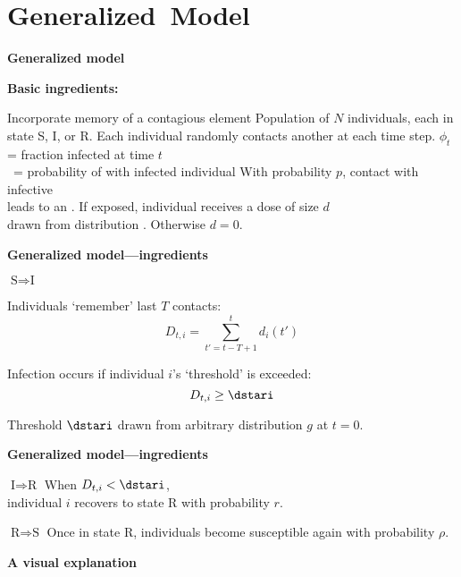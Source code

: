 \section{Generalized\ Model}


  \textbf{Generalized model}

  \textbf{Basic ingredients:}
    
     Incorporate memory of a contagious element\cite{dodds2004a,dodds2005a}
     Population of $N$ individuals, each in state S, I, or R.
     Each individual randomly contacts another at each time step.
     $\phi_t$ = fraction infected at time $t$ \\
      \quad \quad \ = probability of \underline{} with infected individual
     With probability $p$, contact with infective\\
      \quad leads to an \underline{}.
     If exposed, individual receives a dose of size $d$\\
      \quad  drawn from distribution .  Otherwise $d=0$.
    
  



  \textbf{Generalized model---ingredients}

  \textbf{$\boxed{\mbox{S} \Rightarrow \mbox{I}}$}
    
    
      Individuals `remember' last $T$ contacts:
      $$ D_{t,i} = \sum_{t'=t-T+1}^{t} d_i(t') $$
     
      Infection occurs if individual $i$'s `threshold' is exceeded:
      $$ D_{t,i} \ge \dstari $$
    
      Threshold $\dstari$ drawn from arbitrary distribution \alert{$g$} at $t=0$.
    
  


  \textbf{Generalized model---ingredients}

  \textbf{$\boxed{\mbox{I} \Rightarrow \mbox{R}}$}
    When  $D_{t,i} < \dstari $,\\
    individual $i$ recovers to state R
    with probability $r$.
  

  \bigskip
    
  \textbf{$\boxed{\mbox{R} \Rightarrow \mbox{S}}$}
    Once in state R, individuals become susceptible again with
    probability $\rho$.
  


  \textbf{A visual explanation}

